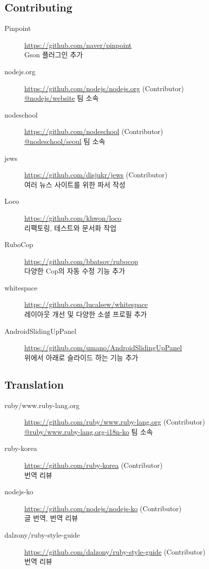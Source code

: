 \documentclass[a4paper,10pt]{article}
\begin{document}
\subsection{Contributing}
\begin{description}
  \item[Pinpoint] \url{https://github.com/naver/pinpoint} \\
    Gson 플러그인 추가
  \item[nodejs.org] \url{https://github.com/nodejs/nodejs.org} (Contributor) \\
    \href{https://github.com/orgs/nodejs/teams/website}{@nodejs/website} 팀 소속
  \item[nodeschool] \url{https://github.com/nodeschool} (Contributor) \\
    \href{https://github.com/orgs/nodeschool/teams/seoul}{@nodeschool/seoul} 팀 소속
  \item[jews] \url{https://github.com/disjukr/jews} (Contributor) \\
    여러 뉴스 사이트를 위한 파서 작성
  \item[Loco] \url{https://github.com/khwon/loco} \\
    리팩토링, 테스트와 문서화 작업
  \item[RuboCop] \url{https://github.com/bbatsov/rubocop} \\
    다양한 Cop의 자동 수정 기능 추가
  \item[whitespace] \url{https://github.com/lucalsew/whitespace} \\
    레이아웃 개선 및 다양한 소셜 프로필 추가
  \item[AndroidSlidingUpPanel] \url{https://github.com/umano/AndroidSlidingUpPanel} \\
    위에서 아래로 슬라이드 하는 기능 추가
\end{description}

\subsection{Translation}
\begin{description}
  \item[ruby/www.ruby-lang.org] \url{https://github.com/ruby/www.ruby-lang.org} (Contributor) \\
    \href{https://github.com/orgs/ruby/teams/www-ruby-lang-org-i18n-ko}{@ruby/www.ruby-lang.org-i18n-ko} 팀 소속
  \item[ruby-korea] \url{https://github.com/ruby-korea} (Contributor) \\
    번역 리뷰
  \item[nodejs-ko] \url{https://github.com/nodejs/nodejs-ko} (Contributor) \\
    글 번역, 번역 리뷰
  \item[dalzony/ruby-style-guide] \url{https://github.com/dalzony/ruby-style-guide} (Contributor) \\
    번역 리뷰
\end{description}


\end{document}
